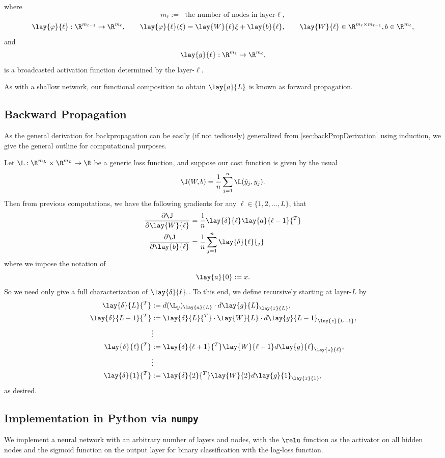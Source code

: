 where
$$m_\ell :=\text{ the number of nodes in layer-$\ell$},$$
$$\lay{\varphi}{\ell}:\R^{m_{\ell-1}}\to\R^{m_\ell},\qquad \lay{\varphi}{\ell}(\xi)=\lay{W}{\ell}\xi+\lay{b}{\ell},\qquad \lay{W}{\ell}\in\R^{m_\ell\times m_{\ell-1}},b\in\R^{m_\ell},$$
and
$$\lay{g}{\ell}:\R^{m_\ell}\to\R^{m_\ell},$$
is a broadcasted activation function determined by the layer-$\ell$.

As with a shallow network, our functional composition to obtain $\lay{a}{L}$ is known as forward propagation.

\subsection{Backward Propagation}
As the general derivation for backpropagation can be easily (if not tediously) generalized from \cref{sec:backPropDerivation} using induction, we give the general outline for computational purposes.

Let $\L:\R^{m_L}\times\R^{m_L}\to\R$ be a generic loss function, and suppose our cost function is given by the usual
$$\J(W,b)=\frac{1}{n}\sum_{j=1}^n\L(\hat{y}_j,y_j).$$
Then from previous computations, we have the following gradients for any $\ell\in\{1,2,...,L\}$, that
\begin{align*}
	\frac{\partial\J}{\partial\lay{W}{\ell}}&=\frac{1}{n}\lay{\delta}{\ell}\lay{a}{\ell-1}{^T}\\
	\frac{\partial\J}{\partial\lay{b}{\ell}}&=\frac{1}{n}\sum_{j=1}^n\lay{\delta}{\ell}{_j}
\end{align*}
where we impose the notation of
$$\lay{a}{0}:=x.$$
So we need only give a full characterization of $\lay{\delta}{\ell}.$. To this end, we define recursively starting at layer-$L$ by
\begin{align*}
	\lay{\delta}{L}{^T}&:=d(\L_y)_{\lay{a}{L}}\cdot d\lay{g}{L}_{\lay{z}{L}},\\
	\lay{\delta}{L-1}{^T}&:=\lay{\delta}{L}{^T}\cdot\lay{W}{L}\cdot d\lay{g}{L-1}_{\lay{z}{L-1}},\\
	&\vdots\\
	\lay{\delta}{\ell}{^T}&:=\lay{\delta}{\ell+1}{^T}\lay{W}{\ell+1}d\lay{g}{\ell}_{\lay{z}{\ell}},\\
	&\vdots\\
	\lay{\delta}{1}{^T}&:=\lay{\delta}{2}{^T}\lay{W}{2}d\lay{g}{1}_{\lay{z}{1}},
\end{align*}
as desired.



\subsection{Implementation in Python via \texttt{numpy}}
We implement a neural network with an arbitrary number of layers and nodes, with the $\relu$ function as the activator on all hidden nodes and the sigmoid function on the output layer for binary classification with the log-loss function.


